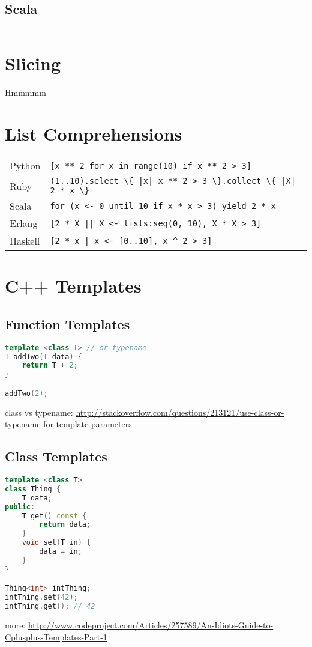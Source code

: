\documentclass{article}
\begin{document}
\subsection{Scala}
\begin{lstlisting}

\end{lstlisting}

\section{Slicing}
Hmmmmm

\section{List Comprehensions}
\begin{longtabu} to 0.75\linewidth { X X }
	Python & \lstinline$[x ** 2 for x in range(10) if x ** 2 > 3]$ \\
	Ruby & \lstinline$(1..10).select \{ |x| x ** 2 > 3 \}.collect \{ |X| 2 * x \}$ \\
	Scala & \lstinline$for (x <- 0 until 10 if x * x > 3) yield 2 * x$ \\
	Erlang & \lstinline$[2 * X || X <- lists:seq(0, 10), X * X > 3]$ \\
	Haskell & \lstinline$[2 * x | x <- [0..10], x ^ 2 > 3]$ \\
\end{longtabu}

\section{C++ Templates}
\subsection{Function Templates}
\begin{lstlisting}[language=C++]
template <class T> // or typename
T addTwo(T data) {
	return T + 2;
}

addTwo(2);
\end{lstlisting}
class vs typename: \url{http://stackoverflow.com/questions/213121/use-class-or-typename-for-template-parameters}
\subsection{Class Templates}
\begin{lstlisting}[language=C++]
template <class T>
class Thing {
	T data;
public:
	T get() const {
		return data;
	}
	void set(T in) {
		data = in;
	}
}

Thing<int> intThing;
intThing.set(42);
intThing.get(); // 42
\end{lstlisting}
more: \url{http://www.codeproject.com/Articles/257589/An-Idiots-Guide-to-Cplusplus-Templates-Part-1}
\end{document}
